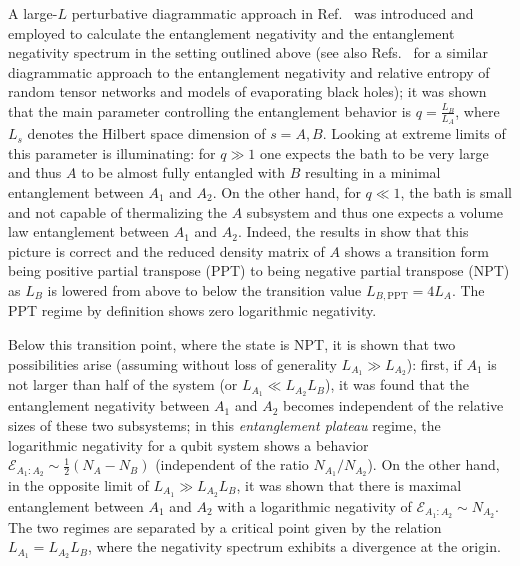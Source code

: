 \documentclass[aps,pra,reprint,superscriptaddress,twocolumn,notitlepage]{revtex4-1}
\numberwithin{equation}{section}
\begin{document}
A large-$L$ perturbative diagrammatic approach in Ref.~\cite{Shapourian2021} was introduced and employed to calculate the entanglement negativity and the entanglement negativity spectrum in the setting outlined above (see also Refs.~\cite{Dong-Qi-2021,Dong2021,KudlerFlam2021_short,KudlerFlam2021_long,KudlerFlam2021_neg} for a similar diagrammatic approach to the entanglement negativity and relative entropy of random tensor networks and models of evaporating black holes);
it was shown that the main parameter controlling the entanglement behavior is $q = \frac{L_B}{L_A}$, where $L_{s}$ denotes the Hilbert space dimension of $s = A,B$. Looking at extreme limits of this parameter is illuminating: for $q \gg 1$ one expects the bath to be very large and thus $A$ to be almost fully entangled with $B$ resulting in a minimal entanglement between $A_1$ and $A_2$. On the other hand, for $q \ll 1$, the bath is small and not capable of thermalizing the $A$ subsystem and thus one expects a volume law entanglement between $A_1$ and $A_2$. Indeed, the results in \cite{Shapourian2021} show that this picture is correct and the reduced density matrix of $A$ shows a transition form being positive partial transpose (PPT) to being negative partial transpose (NPT) as $L_B$ is lowered from above to below the transition value $L_{B, \text{PPT}} = 4L_A$. The PPT regime by definition shows zero logarithmic negativity.

Below this transition point, where the state is NPT, it is shown that two possibilities arise (assuming without loss of generality $L_{A_1}\gg L_{A_2}$): first, if $A_1$ is not larger than half of the system (or $L_{A_1} \ll L_{A_2} L_B$), it was found that the entanglement negativity between $A_1$ and $A_2$ becomes independent of the relative sizes of these two subsystems; in this {\it entanglement plateau} regime, the logarithmic negativity  for a qubit system shows a behavior $\mathcal{E}_{A_1:A_2} \sim \frac12 (N_A-N_B)$ (independent of the ratio $N_{A_1}/N_{A_2}$). On the other hand, in the opposite limit of $L_{A_1} \gg L_{A_2} L_B$, it was shown that there is maximal entanglement between $A_1$ and $A_2$ with a logarithmic negativity of $\mathcal{E}_{A_1:A_2} \sim N_{A_2}$. The two regimes are separated by a critical point given by the relation $L_{A_1} = L_{A_2} L_B$, where the negativity spectrum exhibits a divergence at the origin.
\end{document}

